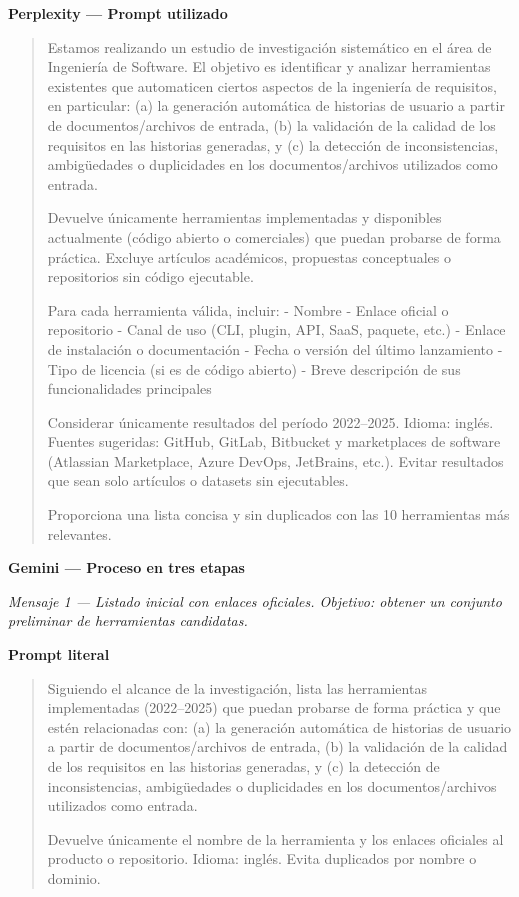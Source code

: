 \documentclass{prgrado}
\begin{document}
\medskip
\textbf{Perplexity — Prompt utilizado}
\begin{quote}
Estamos realizando un estudio de investigación sistemático en el área de Ingeniería de Software.  
El objetivo es identificar y analizar herramientas existentes que automaticen ciertos aspectos de la ingeniería de requisitos, en particular:  
(a) la generación automática de historias de usuario a partir de documentos/archivos de entrada,  
(b) la validación de la calidad de los requisitos en las historias generadas, y  
(c) la detección de inconsistencias, ambigüedades o duplicidades en los documentos/archivos utilizados como entrada.  

Devuelve únicamente herramientas implementadas y disponibles actualmente (código abierto o comerciales) que puedan probarse de forma práctica. Excluye artículos académicos, propuestas conceptuales o repositorios sin código ejecutable.  

Para cada herramienta válida, incluir:  
- Nombre  
- Enlace oficial o repositorio  
- Canal de uso (CLI, plugin, API, SaaS, paquete, etc.)  
- Enlace de instalación o documentación  
- Fecha o versión del último lanzamiento  
- Tipo de licencia (si es de código abierto)  
- Breve descripción de sus funcionalidades principales  

Considerar únicamente resultados del período 2022–2025.  
Idioma: inglés.  
Fuentes sugeridas: GitHub, GitLab, Bitbucket y marketplaces de software (Atlassian Marketplace, Azure DevOps, JetBrains, etc.).  
Evitar resultados que sean solo artículos o datasets sin ejecutables.  

Proporciona una lista concisa y sin duplicados con las 10 herramientas más relevantes.
\end{quote}

\newpage

\medskip
\textbf{Gemini — Proceso en tres etapas}

\textit{Mensaje 1 — Listado inicial con enlaces oficiales. Objetivo: obtener un conjunto preliminar de herramientas candidatas.}
\par\textbf{Prompt literal}
\begin{quote}
Siguiendo el alcance de la investigación, lista las herramientas implementadas (2022–2025) que puedan probarse de forma práctica y que estén relacionadas con:  
(a) la generación automática de historias de usuario a partir de documentos/archivos de entrada,  
(b) la validación de la calidad de los requisitos en las historias generadas, y  
(c) la detección de inconsistencias, ambigüedades o duplicidades en los documentos/archivos utilizados como entrada.    

Devuelve únicamente el nombre de la herramienta y los enlaces oficiales al producto o repositorio.  
Idioma: inglés. Evita duplicados por nombre o dominio.
\end{quote}
\end{document}
